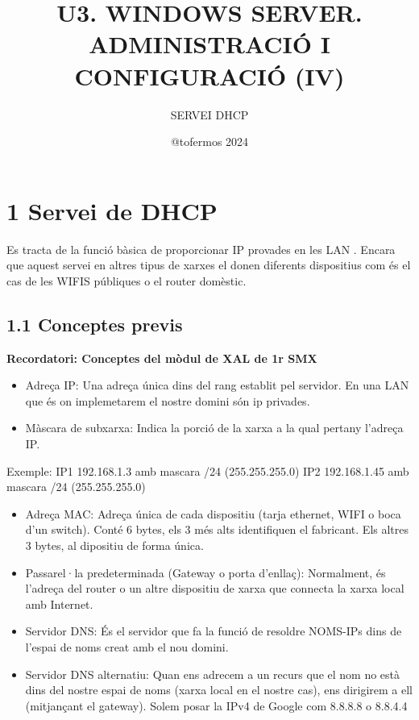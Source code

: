 \documentclass[
  a4paper,
]{article}
\title{U3. WINDOWS SERVER. ADMINISTRACIÓ I CONFIGURACIÓ (IV)}
\subtitle{SERVEI DHCP}
\author{@tofermos 2024}
\date{}
\begin{document}
\maketitle

{
\setcounter{tocdepth}{2}
\tableofcontents
}
\newpage
\renewcommand\tablename{Tabla}

\section{1 Servei de DHCP}\label{servei-de-dhcp}

Es tracta de la funció bàsica de proporcionar IP provades en les LAN .
Encara que aquest servei en altres tipus de xarxes el donen diferents
dispositius com és el cas de les WIFIS públiques o el router domèstic.

\subsection{1.1 Conceptes previs}\label{conceptes-previs}

\textbf{Recordatori: Conceptes del mòdul de XAL de 1r SMX}

\begin{itemize}
\item
  Adreça IP: Una adreça única dins del rang establit pel servidor. En
  una LAN que és on implemetarem el nostre domini són ip privades.
\item
  Màscara de subxarxa: Indica la porció de la xarxa a la qual pertany
  l'adreça IP.
\end{itemize}

Exemple: IP1 192.168.1.3 amb mascara /24 (255.255.255.0) IP2
192.168.1.45 amb mascara /24 (255.255.255.0)

\begin{itemize}
\item
  Adreça MAC: Adreça única de cada dispositiu (tarja ethernet, WIFI o
  boca d'un switch). Conté 6 bytes, els 3 més alts identifiquen el
  fabricant. Els altres 3 bytes, al dipositiu de forma única.
\item
  Passarel·la predeterminada (Gateway o porta d'enllaç): Normalment, és
  l'adreça del router o un altre dispositiu de xarxa que connecta la
  xarxa local amb Internet.
\item
  Servidor DNS: És el servidor que fa la funció de resoldre NOMS-IPs
  dins de l'espai de noms creat amb el nou domini.
\item
  Servidor DNS alternatiu: Quan ens adrecem a un recurs que el nom no
  està dins del nostre espai de noms (xarxa local en el nostre cas), ens
  dirigirem a ell (mitjançant el gateway). Solem posar la IPv4 de Google
  com 8.8.8.8 o 8.8.4.4
\end{itemize}
\end{document}
